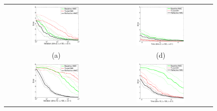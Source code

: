 \documentclass{article} %
\begin{document}
\begin{figure}[t!]
\label{fig:results}
\vspace{-1mm}
\begin{center}
\begin{tabular}{cc}
   \hspace{-5mm} \includegraphics[width=0.49\textwidth,height=0.35\textwidth]{plots1/expectationVsamples_dim2.pdf} 
& \hspace{-3mm} \includegraphics[width=0.49\textwidth,height=0.35\textwidth]{plots1/expectationVtime_dim2.pdf} 
\vspace{-1.5mm}
\\
   \hspace{-5mm} \footnotesize(a) 
& \hspace{-4mm} \footnotesize(d) 
\\
\hspace{-5mm} \includegraphics[width=0.49\textwidth,height=0.35\textwidth]{plots1/expectationVsamples_dim10.pdf} 
& \hspace{-3mm} \includegraphics[width=0.49\textwidth,height=0.35\textwidth]{plots1/expectationVtime_dim10.pdf} 

\end{tabular}
\end{center}
\end{figure}
\end{document}
